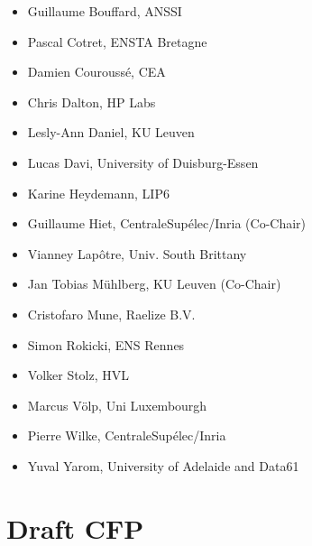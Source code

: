 \documentclass[a4paper,11pt]{article} %
\numberwithin{equation}{section} %
\numberwithin{figure}{section} %
\numberwithin{table}{section} %
\begin{document}
\begin{itemize}
    \item Guillaume Bouffard, ANSSI
    \item Pascal Cotret, ENSTA Bretagne
    \item Damien Couroussé, CEA
    \item Chris Dalton, HP Labs
    \item{Lesly-Ann Daniel, KU Leuven}
    \item Lucas Davi, University of Duisburg-Essen
    \item Karine Heydemann, LIP6
    \item Guillaume Hiet, CentraleSupélec/Inria (Co-Chair)
    \item Vianney Lapôtre, Univ. South Brittany
    \item Jan Tobias Mühlberg, KU Leuven (Co-Chair)
    \item Cristofaro Mune, Raelize B.V.
    \item Simon Rokicki, ENS Rennes
    \item Volker Stolz, HVL
    \item{Marcus V\"olp, Uni Luxembourgh}
    \item Pierre Wilke, CentraleSupélec/Inria
    \item Yuval Yarom, University of Adelaide and Data61
\end{itemize}


\section{Draft CFP}


\end{document}
